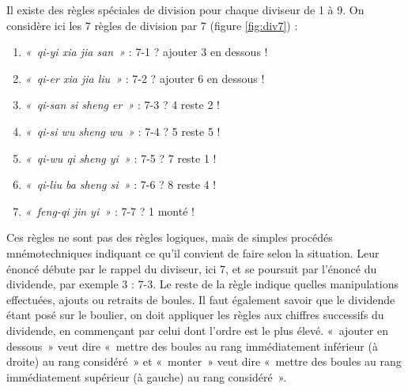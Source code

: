\begin{td}
\noindent
\begin{minipage}[t]{14cm}
Il existe des règles spéciales de division pour chaque diviseur de 1 à 9.
On consid\`ere ici les 7 r\`egles de division par 7 (figure \ref{fig:div7}) :\\
\noindent\begin{minipage}[t]{7cm}\footnotesize
\begin{enumerate}
\item {\em «~qi-yi xia jia san~»} : 7-1 ? ajouter 3 en dessous ! \\
\item {\em «~qi-er xia jia liu~»} : 7-2 ? ajouter 6 en dessous ! \\
\item {\em «~qi-san si sheng er~»} : 7-3 ? 4 reste 2 ! \\
\end{enumerate}
\end{minipage}\hfill
\begin{minipage}[t]{7cm}\footnotesize
\begin{enumerate}\setcounter{enumi}{3}
\item {\em «~qi-si wu sheng wu~»} : 7-4 ? 5 reste 5 ! \\
\item {\em «~qi-wu qi sheng yi~»} : 7-5 ? 7 reste 1 ! \\
\item {\em «~qi-liu ba sheng si~»} : 7-6 ? 8 reste 4 ! \\
\item {\em «~feng-qi jin yi~»} : 7-7 ? 1 monté ! \\
\end{enumerate}
\end{minipage}
\end{minipage}
\hfill
\begin{minipage}[t]{8cm}
\end{minipage}

\noindent
\begin{minipage}[t]{15cm}
Ces règles ne sont pas des règles logiques, 
mais de simples procédés mnémotechniques
indiquant ce qu'il convient de faire selon la situation. Leur énoncé débute par le
rappel du diviseur, ici 7, et se poursuit par l'énoncé du dividende, par exemple 3 :
7-3. Le reste de la règle indique quelles manipulations effectuées, ajouts ou retraits
de boules. Il faut également savoir que le dividende étant posé sur le boulier, on doit
appliquer les règles aux chiffres successifs du dividende, en commençant par celui dont
l'ordre est le plus élevé.
«~ajouter en dessous~» veut dire «~mettre des boules au rang 
immédiatement inférieur (à droite) au rang considéré~» et «~monter~» veut dire «~mettre des boules
au rang immédiatement supérieur (à gauche) au rang considéré~».


\end{minipage}
\end{td}
